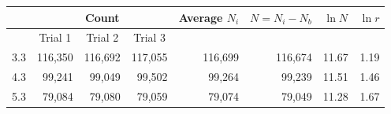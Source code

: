     \begin{table}[h]
    	\begin{tabular}{|r|r|r|r|r|r|r|r|}
    		\hline
    		\rowcolor[HTML]{EFEFEF} 
    		\multicolumn{1}{|c|}{\cellcolor[HTML]{EFEFEF}Distance} & \multicolumn{3}{c|}{\cellcolor[HTML]{EFEFEF}Count}                                                                                                                 & \multicolumn{1}{c|}{\cellcolor[HTML]{EFEFEF}Average $ N_i $} & \multicolumn{1}{c|}{\cellcolor[HTML]{EFEFEF}$ N = N_i-N_b $} & \multicolumn{1}{c|}{\cellcolor[HTML]{EFEFEF}$ \ln N $} & \multicolumn{1}{c|}{\cellcolor[HTML]{EFEFEF}$ \ln r $} \\ \hline
    		\rowcolor[HTML]{EFEFEF} 
    		\multicolumn{1}{|l|}{\cellcolor[HTML]{EFEFEF}}         & \multicolumn{1}{c|}{\cellcolor[HTML]{EFEFEF}Trial 1} & \multicolumn{1}{c|}{\cellcolor[HTML]{EFEFEF}Trial 2} & \multicolumn{1}{c|}{\cellcolor[HTML]{EFEFEF}Trial 3} & \multicolumn{1}{l|}{\cellcolor[HTML]{EFEFEF}}           & \multicolumn{1}{l|}{\cellcolor[HTML]{EFEFEF}}          & \multicolumn{1}{l|}{\cellcolor[HTML]{EFEFEF}}     & \multicolumn{1}{l|}{\cellcolor[HTML]{EFEFEF}}     \\ \hline
    		3.3                                                    & 116,350                                              & 116,692                                              & 117,055                                              & 116,699                                                 & 116,674                                                & 11.67                                             & 1.19                                              \\ \hline
    		4.3                                                    & 99,241                                               & 99,049                                               & 99,502                                               & 99,264                                                  & 99,239                                                 & 11.51                                             & 1.46                                              \\ \hline
    		5.3                                                    & 79,084                                               & 79,080                                               & 79,059                                               & 79,074                                                  & 79,049                                                 & 11.28                                             & 1.67                                              \\ \hline

\end{tabular}
\end{table}
